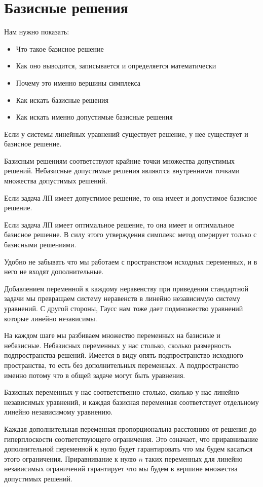 \documentclass[a4paper,article,14pt]{extarticle}
\begin{document}
\section{Базисные решения}

Нам нужно показать:
\begin{itemize}
    \item Что такое базисное решение
    \item Как оно выводится, записывается и определяется математически
    \item Почему это именно вершины симплекса
    \item Как искать базисные решения
    \item Как искать именно допустимые базисные решения
\end{itemize}

Если у системы линейных уравнений существует решение, у нее существует и базисное решение.

Базисным решениям соответствуют крайние точки множества допустимых решений.
Небазисные допустимые решения являются внутренними точками множества допустимых решений.

Если задача ЛП имеет допустимое решение, то она имеет и допустимое базисное решение.

Если задача ЛП имеет оптимальное решение, то она имеет и оптимальное базисное решение.
В силу этого утверждения симплекс метод оперирует только с базисными решениями.

Удобно не забывать что мы работаем с пространством исходных переменных, и в него не входят дополнительные.

Добавлением переменной к каждому неравенству при приведении стандартной задачи мы превращаем систему неравенств в линейно независимую систему уравнений.
С другой стороны, Гаусс нам тоже дает подмножество уравнений которые линейно независимы.

На каждом шаге мы разбиваем множество переменных на базисные и небазисные.
Небазисных переменных у нас столько, сколько размерность подпространства решений.
Имеется в виду опять подпространство исходного пространства, то есть без дополнительных переменных.
А подпространство именно потому что в общей задаче могут быть уравнения.

Базисных переменных у нас соответственно столько, сколько у нас линейно независимых уравнений, и каждая базисная переменная соответствует отдельному линейно независимому уравнению.

Каждая дополнительная переменная пропорциональна расстоянию от решения до гиперплоскости соответствующего ограничения.
Это означает, что приравнивание дополнительной переменной к нулю будет гарантировать что мы будем касаться этого ограничения.
Приравнивание к нулю \(n\) таких переменных для линейно независимых ограничений гарантирует что мы будем в вершине множества допустимых решений.
\end{document}
